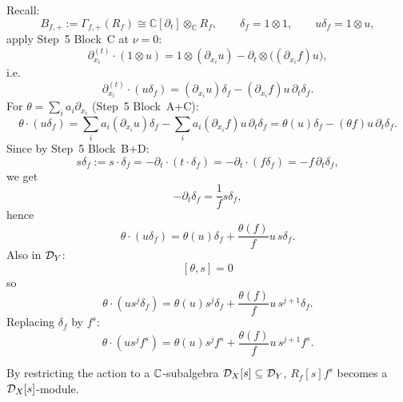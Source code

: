 \begin{example}
\begin{enumerate}
              Recall:
              \[
                  B_{f,+} := \Gamma_{f,+}(R_f)\cong\mathbb{C}[\partial_t]\otimes_{\mathbb{C}}R_f,\qquad
                  \delta_f=1\otimes 1,\qquad u\delta_f=1\otimes u,
              \]
              apply Step~5 Block~C at $\nu=0$:
              \[
                  \partial_{x_i}^{(t)}\cdot(1\otimes u)
                  =1\otimes(\partial_{x_i}u)-\partial_t\otimes\bigl((\partial_{x_i}f)u\bigr),
              \]
              i.e.
              \[
                  \partial_{x_i}^{(t)}\cdot(u\delta_f)
                  =(\partial_{x_i}u)\delta_f-(\partial_{x_i}f)u\,\partial_t\delta_f.
              \]
              For $\theta=\sum_i a_i\partial_{x_i}$ (Step~5 Block~A+C):
              \[
                  \theta\cdot(u\delta_f)
                  =\sum_i a_i(\partial_{x_i}u)\delta_f-\sum_i a_i(\partial_{x_i}f)u\,\partial_t\delta_f
                  =\theta(u)\delta_f-(\theta f)u\,\partial_t\delta_f.
              \]
              Since by Step~5 Block~B+D:
              \[
                  s\delta_f := s\cdot\delta_f=-\partial_t\cdot(t\cdot\delta_f)=-\partial_t\cdot(f\delta_f)=-f\,\partial_t\delta_f,
              \]
              we get
              \[
                  -\partial_t\delta_f=\frac{1}{f}s\delta_f,
              \]
              hence
              \[
                  \theta\cdot(u\delta_f)=\theta(u)\delta_f+\frac{\theta(f)}{f}u\,s\delta_f.
              \]
              Also in $\mathcal{D}_Y$:
              \[
                  [\theta,s]=0
              \]
              so
              \[
                  \theta\cdot(us^j\delta_f)
                  =\theta(u)s^j\delta_f+\frac{\theta(f)}{f}u\,s^{j+1}\delta_f.
              \]
              Replacing $\delta_f$ by $f^s$:
              \[
                  \theta\cdot(us^j f^s)
                  =\theta(u)s^j f^s+\frac{\theta(f)}{f}u\,s^{j+1}f^s.
              \]

              By restricting the action to a $\mathbb{C}$-subalgebra $\mathcal{D}_X[s]\subseteq\mathcal{D}_Y$, $R_f[s]f^s$ becomes a $\mathcal{D}_X[s]$-module.
    \end{enumerate}

\end{example}

